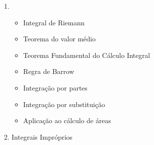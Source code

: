 \documentclass{article}
\begin{document}
\begin{multicols}{2}
\begin{enumerate}[label=\arabic*.]
\begin{enumerate}
\begin{itemize}[left = -9mm]
		\end{itemize}
		
		\item \
		\begin{itemize}[left = -9mm]
		
			\item Integral de Riemann
			\item Teorema do valor médio
			\item Teorema Fundamental do Cálculo Integral
			\item Regra de Barrow
			\item Integração por partes
			\item Integração por substituição
			\item Aplicação ao cálculo de áreas
			
		\end{itemize}
		
		\item Integrais Impróprios
		
	\end{enumerate}	
	
\end{enumerate}
\end{multicols}

%
%
%
% 
%
%
%
%
%
%
%
%
%
%
%
%
%
\end{document}
